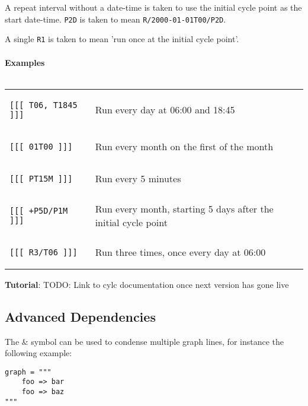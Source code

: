 A repeat interval without a date-time is taken to use the initial cycle point as the start date-time. \lstinline{P2D} is taken to mean \lstinline{R/2000-01-01T00/P2D}.

A single \lstinline{R1} is taken to mean 'run once at the initial cycle point'.

\paragraph*{Examples} $ $

\begin{tabular}{l l}
\begin{lstlisting}
[[[ T06, T1845 ]]]
\end{lstlisting}
& Run every day at 06:00 and 18:45\\
\begin{lstlisting}
[[[ 01T00 ]]]
\end{lstlisting}
& Run every month on the first of the month \\
\begin{lstlisting}
[[[ PT15M ]]]
\end{lstlisting}
& Run every 5 minutes \\
\begin{lstlisting}
[[[ +P5D/P1M ]]]
\end{lstlisting}
& Run every month, starting 5 days after the initial cycle point \\
\begin{lstlisting}
[[[ R3/T06 ]]]
\end{lstlisting}
& Run three times, once every day at 06:00
\\
\end{tabular}

\begin{shaded*}
\textbf{Tutorial}: TODO: Link to cylc documentation once next version has gone live
\end{shaded*}


\subsection{Advanced Dependencies}

The \& symbol can be used to condense multiple graph lines, for instance the
following example:

\begin{lstlisting}
graph = """
    foo => bar
    foo => baz
"""
\end{lstlisting}

